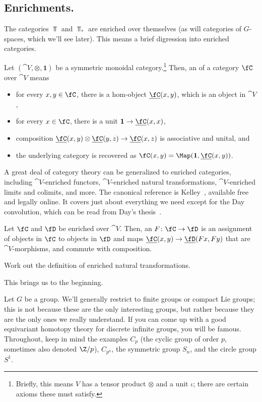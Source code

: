 \subsection*{Enrichments.}
The categories $\Top$ and $\Top_*$ are enriched over themselves (as will categories of $G$-spaces, which we'll see
later). This means a brief digression into enriched categories.
\begin{defn}
Let $(\cat V,\otimes, \boldsymbol 1)$ be a symmetric monoidal category.\footnote{Briefly, this means $V$ has a
tensor product $\otimes$ and a unit $\iota$; there are certain axioms these must satisfy.} Then, an
 of a category $\fC$ over $\cat V$ means
\begin{itemize}
	\item for every $x,y\in\fC$, there is a hom-object $\underline\fC(x,y)$, which is an object in $\cat V$,
	\item for every $x\in\fC$, there is a unit $\boldsymbol 1\to\underline\fC(x,x)$,
	\item composition $\underline\fC(x,y)\otimes\underline\fC(y,z)\to\underline\fC(x,z)$ is associative and unital,
	and
	\item the underlying category is recovered as $\fC(x,y) = \Map(\boldsymbol 1, \underline\fC(x,y))$.
\end{itemize}
\end{defn}
A great deal of category theory can be generalized to enriched categories, including $\cat V$-enriched functors,
$\cat V$-enriched natural transformations, $\cat V$-enriched limits and colimits, and more. The canonical reference
is Kelley~\cite{Kelley}, available free and legally online. It covers just about everything we need except for the
Day convolution, which can be read from Day's thesis~\cite{DayThesis}.
\begin{defn}
Let $\fC$ and $\fD$ be enriched over $\cat V$. Then, an  $F\colon\fC\to\fD$ is an assignment
of objects in $\fC$ to objects in $\fD$ and maps $\underline\fC(x,y)\to\underline\fD(Fx, Fy)$ that are $\cat
V$-morphisms, and commute with composition.
\end{defn}
\begin{ex}
Work out the definition of enriched natural transformations.
\end{ex}
This brings us to the beginning.

\orbreak

Let $G$ be a group. We'll generally restrict to finite groups or compact Lie groups; this is not because these are
the only interesting groups, but rather because they are the only ones we really understand. If you can come up
with a good equivariant homotopy theory for discrete infinite groups, you will be famous. Throughout, keep in mind
the examples $C_p$ (the cyclic group of order $p$, sometimes also denoted $\Z/p$), $C_{p^n}$, the symmetric group
$S_n$, and the circle group $S^1$.


